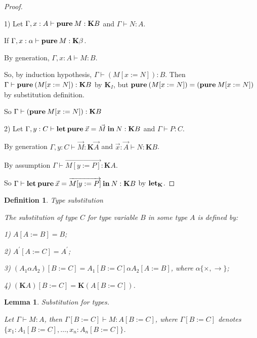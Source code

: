 \documentclass[a4paper]{article}
\newtheorem{lemma}{Lemma}
\newtheorem{defin}{Definition}
\begin{document}
  \begin{proof}

  $ $

  1) Let $\Gamma, x : A \vdash {\bf pure \: } M : \textbf{K}B$ and $\Gamma \vdash N : A$.

  If $\Gamma, x : \alpha \vdash {\bf pure \: } M : \textbf{K}\beta$.

  By generation, $\Gamma, x : A \vdash M : B$.

  So, by induction hypothesis, $\Gamma \vdash (M [x := N]) : B $.
  Then $\Gamma \vdash {\bf pure \: } (M [x := N]) : \textbf{K}B$ by $\textbf{K}_I$, but ${\bf pure \: } (M [x := N]) =
  ({\bf pure \: } M [x := N])$ by substitution definition.

  So $\Gamma \vdash ({\bf pure \: } M [x := N]) : \textbf{K}B$

  2) Let $\Gamma, y : C \vdash {\bf let \: pure \:} \vec{x} = \vec{M} {\bf \: in \:} N : \textbf{K}B$ and $\Gamma \vdash P : C$.

  By generation $\Gamma, y : C \vdash \vec{M} : \textbf{K}\vec{A}$ and $\vec{x} : \vec{A} \vdash N : \textbf{K}B$.

  By assumption $\Gamma \vdash \overrightarrow{M [y := P]} : \textbf{K}A$.

  So $\Gamma \vdash {\bf let \: pure \:} \vec{x} = \overrightarrow{M [y := P]} {\bf \: in \:} N : \textbf{K}B$ by ${\bf let}_{\textbf{K}}$.

  \end{proof}

  \vspace{\baselineskip}

  \begin{defin} Type substitution

    The substitution of type $C$ for type variable $B$ in some type $A$ is defined by:

    1) $A [ A := B ] = B$;

    2) $A^{'} [A := C] = A^{'}$;

    3) $(A_1 \alpha A_2) [B := C] = A_1 [B := C] \alpha A_2 [A := B]$, where $\alpha \{ \times, \to \}$;

    4) $(\textbf{K}A) [B := C] = \textbf{K}(A [B := C])$.

  \end{defin}

    \vspace{\baselineskip}

  \begin{lemma} Substitution for types.

    Let $\Gamma \vdash M : A$, then $\Gamma [B := C] \vdash M : A [B := C]$, where $\Gamma [B := C]$ denotes $\{ x_1 : A_1 [B := C],\dots, x_n : A_n [B := C] \}$.

  \end{lemma}
\end{document}
